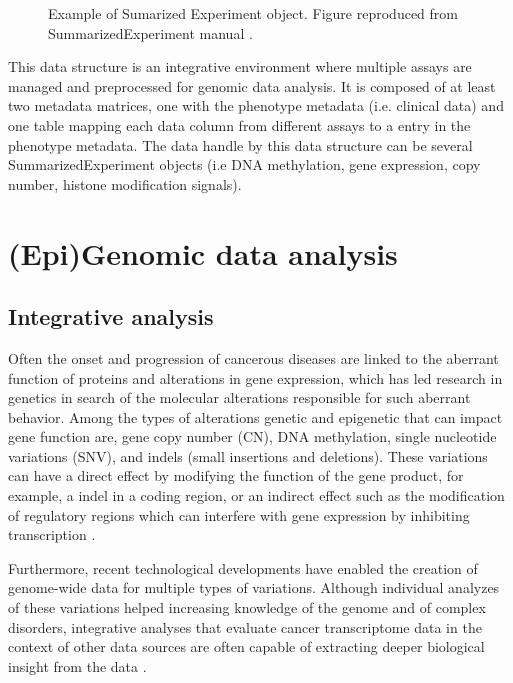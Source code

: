 \begin{description}
\begin{figure}[ht!]
  \caption[Sumarized Experiment object]{\label{fig:SE} Example of Sumarized Experiment object. Figure reproduced from SummarizedExperiment manual \cite{SummarizedExperiment}.}
  \end{figure}
  \item [\sigla{MAE}{MultiAssayExperiment}:] This data structure is an integrative environment where multiple assays are managed and preprocessed for genomic data analysis.  It is composed of at least two metadata matrices, one with the phenotype metadata (i.e. clinical data) and one table mapping each data column from different assays to a entry in the phenotype metadata. The data handle by this data structure can be several SummarizedExperiment objects (i.e DNA methylation, gene expression, copy number, histone modification signals).

\end{description}





\section{(Epi)Genomic data analysis} \label{sec:concept-analysis}

\subsection{Integrative analysis}
Often the onset and progression of cancerous diseases are
linked to the aberrant function of proteins and alterations in gene expression,
which has led research in genetics in search of the molecular alterations responsible for such aberrant behavior.
Among the types of alterations genetic and epigenetic
that can impact gene function are, gene copy number
(CN), DNA methylation, single nucleotide variations (SNV), and indels (small insertions and
deletions).
These variations can have a direct effect by modifying
 the function of the gene product, for example, a
indel in a coding region, or an indirect effect such as
the modification of  regulatory regions which can interfere
 with gene expression by inhibiting transcription \cite{thingholm2016strategies}.

Furthermore, recent technological developments have enabled the creation of genome-wide data for multiple types of variations.
Although individual analyzes of these variations helped  increasing knowledge of the genome and of complex
disorders, integrative analyses that evaluate cancer transcriptome data in the context of other data sources are often capable of extracting deeper biological insight from the data \cite{rhodes2005integrative}.

